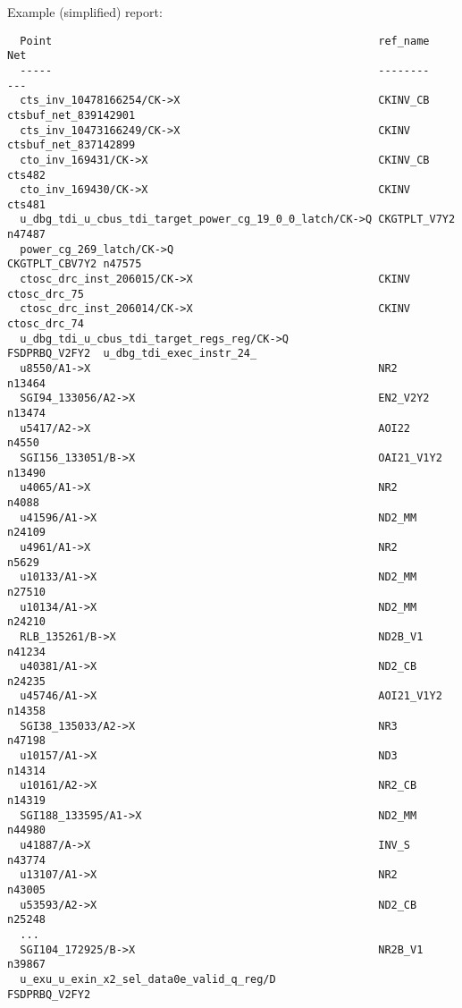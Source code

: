 \documentclass[professionalfonts]{beamer}
\begin{document}
\begin{frame}[fragile]
  Example (simplified) report:
  \tiny
  \begin{verbatim}
  Point                                                   ref_name       Net       
  -----                                                   --------       ---       
  cts_inv_10478166254/CK->X                               CKINV_CB       ctsbuf_net_839142901
  cts_inv_10473166249/CK->X                               CKINV          ctsbuf_net_837142899
  cto_inv_169431/CK->X                                    CKINV_CB       cts482    
  cto_inv_169430/CK->X                                    CKINV          cts481    
  u_dbg_tdi_u_cbus_tdi_target_power_cg_19_0_0_latch/CK->Q CKGTPLT_V7Y2   n47487    
  power_cg_269_latch/CK->Q                                CKGTPLT_CBV7Y2 n47575    
  ctosc_drc_inst_206015/CK->X                             CKINV          ctosc_drc_75
  ctosc_drc_inst_206014/CK->X                             CKINV          ctosc_drc_74
  u_dbg_tdi_u_cbus_tdi_target_regs_reg/CK->Q              FSDPRBQ_V2FY2  u_dbg_tdi_exec_instr_24_
  u8550/A1->X                                             NR2            n13464    
  SGI94_133056/A2->X                                      EN2_V2Y2       n13474    
  u5417/A2->X                                             AOI22          n4550     
  SGI156_133051/B->X                                      OAI21_V1Y2     n13490    
  u4065/A1->X                                             NR2            n4088     
  u41596/A1->X                                            ND2_MM         n24109    
  u4961/A1->X                                             NR2            n5629     
  u10133/A1->X                                            ND2_MM         n27510    
  u10134/A1->X                                            ND2_MM         n24210    
  RLB_135261/B->X                                         ND2B_V1        n41234    
  u40381/A1->X                                            ND2_CB         n24235    
  u45746/A1->X                                            AOI21_V1Y2     n14358    
  SGI38_135033/A2->X                                      NR3            n47198    
  u10157/A1->X                                            ND3            n14314    
  u10161/A2->X                                            NR2_CB         n14319    
  SGI188_133595/A1->X                                     ND2_MM         n44980    
  u41887/A->X                                             INV_S          n43774    
  u13107/A1->X                                            NR2            n43005    
  u53593/A2->X                                            ND2_CB         n25248    
  ...
  SGI104_172925/B->X                                      NR2B_V1        n39867
  u_exu_u_exin_x2_sel_data0e_valid_q_reg/D                FSDPRBQ_V2FY2
  \end{verbatim}
\end{frame}
\end{document}
